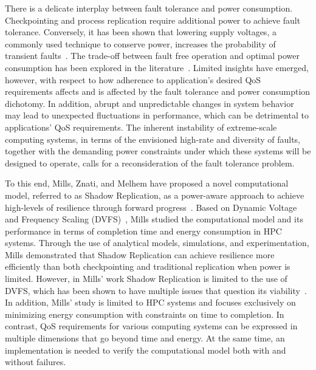 There is a delicate interplay between fault tolerance and power consumption. Checkpointing and process replication require 
additional power to achieve fault tolerance. Conversely, it has been shown that lowering supply voltages, a commonly used 
technique to conserve power, increases the probability of transient faults~\cite{chandra2008defect,zhao2008reliability}. The trade-off between fault free operation and 
optimal power consumption has been explored in the literature~\cite{meneses2014energy,mills2014energy}. Limited insights have emerged, however, with respect to how 
adherence to application's desired QoS requirements affects and is affected by the fault tolerance and power consumption 
dichotomy. In addition, abrupt and unpredictable changes in system behavior may lead to unexpected fluctuations in performance, 
which can be detrimental to applications’ QoS requirements. The inherent instability of extreme-scale computing systems, 
in terms of the envisioned high-rate and diversity of faults, together with the demanding power constraints under which 
these systems will be designed to operate, calls for a 
reconsideration of the fault tolerance problem.

To this end, Mills, Znati, and Melhem have proposed a novel computational model, referred to as Shadow Replication, as a  
power-aware approach to achieve high-levels of resilience through forward progress~\cite{mills_2014_icnc,mills_2014_pdp,mills2014power}. Based on Dynamic Voltage and Frequency Scaling (DVFS)~\cite{Orgerie:2014:STI:2597757.2532637,4658633,LeSueur:2010:DVF:1924920.1924921}, Mills studied the computational model and its performance in terms of completion time and energy consumption in HPC systems. Through the use of analytical models, simulations, and experimentation, Mills demonstrated that Shadow Replication can achieve resilience more efficiently than both checkpointing and traditional replication when power is limited. However, in Mills' work Shadow Replication is limited to the use of DVFS, which has been shown to have multiple issues that question its viability~\cite{Eyerman:2011:FDU:1952998.1952999,Keller:EECS-2015-257,chandra2008defect,zhao2008reliability}. In addition, Mills' study is limited to HPC systems and focuses exclusively on minimizing energy consumption with constraints on time to completion. In contrast, QoS requirements for various computing systems can be expressed in multiple dimensions that go beyond time and energy. At the same time, an implementation is needed to verify the computational model both with and without failures. 


